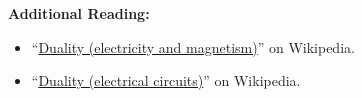 
{\bf Additional Reading:}
\begin{itemize}
\item ``\href{https://en.wikipedia.org/wiki/Duality_(electricity_and_magnetism)}{Duality (electricity and magnetism)}'' on Wikipedia.
\item ``\href{https://en.wikipedia.org/wiki/Duality_(electrical_circuits)}{Duality (electrical circuits)}'' on Wikipedia.
\end{itemize}





